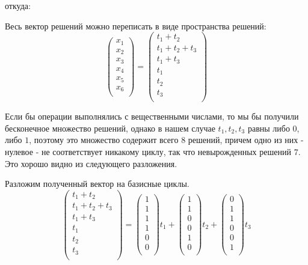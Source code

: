 \documentclass[russian]{lecture-notes}
\begin{document}
откуда:

Весь вектор решений можно переписать в виде пространства решений:
$$\begin{pmatrix}
  x_1\\
  x_2\\
  x_3\\
  x_4\\
  x_5\\
  x_6\\
\end{pmatrix}
=
\begin{pmatrix}
  t_1+t_2\\
  t_1+t_2+t_3\\
  t_1+t_3\\
  t_1\\
  t_2\\
  t_3\\
\end{pmatrix}
$$

\begin{note}
    Если бы операции выполнялись с вещественными числами, то мы бы получили бесконечное множество решений, однако в нашем случае $t_1, t_2, t_3$ равны либо $0$, либо $1$, поэтому это множество содержит всего $8$ решений, причем одно из них - нулевое - не соответствует никакому циклу, так что невырожденных решений $7$. Это хорошо видно из следующего разложения.
\end{note}


Разложим полученный вектор на базисные циклы.
$$
\begin{pmatrix}
  t_1+t_2\\
  t_1+t_2+t_3\\
  t_1+t_3\\
  t_1\\
  t_2\\
  t_3\\
\end{pmatrix} 
=
\begin{pmatrix}
  1\\
  1\\
  1\\
  1\\
  0\\
  0\\
\end{pmatrix}
t_1
+
\begin{pmatrix}
  1\\
  1\\
  0\\
  0\\
  1\\
  0\\
\end{pmatrix}
t_2
+
\begin{pmatrix}
  0\\
  1\\
  1\\
  0\\
  0\\
  1\\
\end{pmatrix}
t_3
$$
\end{document}
